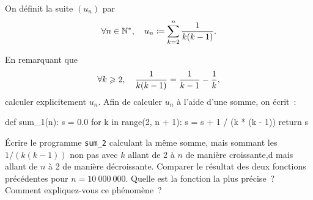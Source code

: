 \documentclass{magnolia}
\begin{document}
On définit la suite $(u_n)$ par
\[\forall n\in{\mathbb{N}^*},\quad u_n\coloneqq \sum_{k=2}^n \frac{1}{k(k-1)}.\]
\begin{questions}
\question En remarquant que
  \[\forall k\geqslant 2,\quad \frac{1}{k(k-1)}=\frac{1}{k-1} - \frac{1}{k},\]
  calculer explicitement $u_n$.
\question Afin de calculer $u_n$ à l'aide d'une somme, on écrit~:
\begin{pythoncodeline}
def sum_1(n):
    s = 0.0
    for k in range(2, n + 1):
        s = s + 1 / (k * (k - 1))
    return s
\end{pythoncodeline}
  Écrire le programme \verb!sum_2! calculant la même somme, mais sommant les $1/(k(k-1))$
  non pas avec $k$ allant de 2 à $n$ de manière croissante,d mais allant de $n$ à 2 de
  manière décroissante.
\question Comparer le résultat des deux fonctions précédentes pour $n = 10\ 000\ 000$.
  Quelle est la fonction la plus précise~? Comment expliquez-vous ce phénomène~?
\end{questions}





\end{document}
